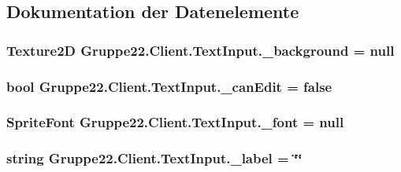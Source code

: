 \subsection{Dokumentation der Datenelemente}
\hypertarget{class_gruppe22_1_1_client_1_1_text_input_aad2ed3307a1e3dd8684a0aba48bfe55d}{
\subsubsection[{\-\_\-background}]{\setlength{\rightskip}{0pt plus 5cm}Texture2\-D Gruppe22.\-Client.\-Text\-Input.\-\_\-background = null\hspace{0.3cm}{\ttfamily [protected]}}}\label{class_gruppe22_1_1_client_1_1_text_input_aad2ed3307a1e3dd8684a0aba48bfe55d}
\hypertarget{class_gruppe22_1_1_client_1_1_text_input_a97938831e8ee83ad77e160ea51428505}{
\subsubsection[{\-\_\-can\-Edit}]{\setlength{\rightskip}{0pt plus 5cm}bool Gruppe22.\-Client.\-Text\-Input.\-\_\-can\-Edit = false\hspace{0.3cm}{\ttfamily [protected]}}}\label{class_gruppe22_1_1_client_1_1_text_input_a97938831e8ee83ad77e160ea51428505}
\hypertarget{class_gruppe22_1_1_client_1_1_text_input_afaa8c705ebedf4acf422f4de1b1f6f71}{
\subsubsection[{\-\_\-font}]{\setlength{\rightskip}{0pt plus 5cm}Sprite\-Font Gruppe22.\-Client.\-Text\-Input.\-\_\-font = null\hspace{0.3cm}{\ttfamily [protected]}}}\label{class_gruppe22_1_1_client_1_1_text_input_afaa8c705ebedf4acf422f4de1b1f6f71}
\hypertarget{class_gruppe22_1_1_client_1_1_text_input_a725d60af4b5f21d1240f3aefb98a849e}{
\subsubsection[{\-\_\-label}]{\setlength{\rightskip}{0pt plus 5cm}string Gruppe22.\-Client.\-Text\-Input.\-\_\-label = \char`\"{}\char`\"{}\hspace{0.3cm}{\ttfamily [protected]}}}\label{class_gruppe22_1_1_client_1_1_text_input_a725d60af4b5f21d1240f3aefb98a849e}
